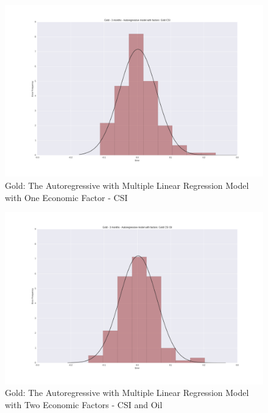 \documentclass[runningheads]{llncs}
\begin{document}
\begin{figure}
\centering
\includegraphics[width=\textwidth]{Gold_CSI.png}
\caption{Gold: The Autoregressive with Multiple Linear Regression Model with One Economic Factor - CSI}
\label{fig:Gold_CSI.png}
\end{figure}

\begin{figure}
\centering
\includegraphics[width=\textwidth]{Gold_CSI_Oil.png}
\caption{Gold: The Autoregressive with Multiple Linear Regression Model with Two Economic Factors - CSI and Oil}
\label{fig:Gold_CSI_Oil.png}
\end{figure}
\end{document}
